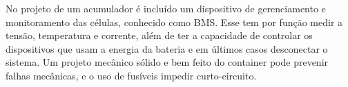          No projeto de um acumulador é incluído um dispositivo de gerenciamento e monitoramento das células, conhecido como BMS. Esse tem por função medir a tensão, temperatura e corrente, além de ter a capacidade de controlar os dispositivos que usam a energia da bateria e em últimos casos desconectar o sistema. Um projeto mecânico sólido e bem feito do container pode prevenir falhas mecânicas, e o uso de fusíveis impedir curto-circuito.